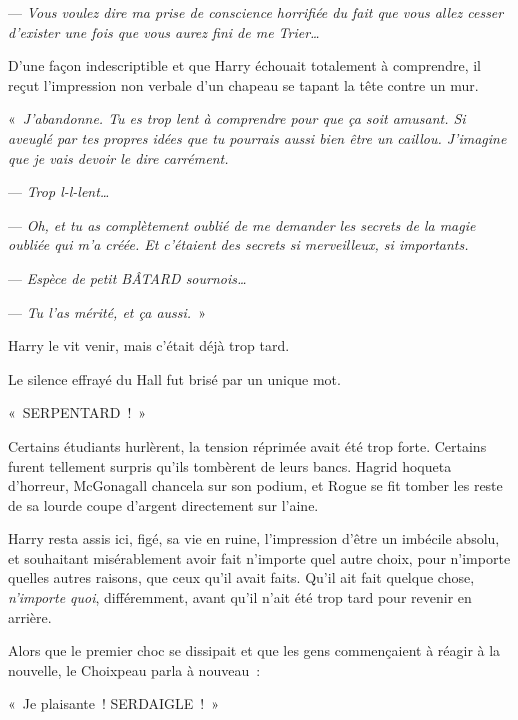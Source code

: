 --- \emph{Vous voulez dire ma prise de conscience horrifiée du fait que vous allez cesser d'exister une fois que vous aurez fini de me Trier…}

D'une façon indescriptible et que Harry échouait totalement à comprendre, il reçut l'impression non verbale d'un chapeau se tapant la tête contre un mur.

«~\emph{J'abandonne. Tu es trop lent à comprendre pour que ça soit amusant. Si aveuglé par tes propres idées que tu pourrais aussi bien être un caillou. J'imagine que je vais devoir le dire carrément.}

--- \emph{Trop l-l-lent…}

--- \emph{Oh, et tu as complètement oublié de me demander les secrets de la magie oubliée qui m'a créée. Et c'étaient des secrets si merveilleux, si importants.}

--- \emph{Espèce de petit BÂTARD sournois…}

--- \emph{Tu l'as mérité, et ça aussi.}~»

Harry le vit venir, mais c'était déjà trop tard.

Le silence effrayé du Hall fut brisé par un unique mot.

«~SERPENTARD~!~»

Certains étudiants hurlèrent, la tension réprimée avait été trop forte. Certains furent tellement surpris qu'ils tombèrent de leurs bancs. Hagrid hoqueta d'horreur, McGonagall chancela sur son podium, et Rogue se fit tomber les reste de sa lourde coupe d'argent directement sur l'aine.

Harry resta assis ici, figé, sa vie en ruine, l'impression d'être un imbécile absolu, et souhaitant misérablement avoir fait n'importe quel autre choix, pour n'importe quelles autres raisons, que ceux qu'il avait faits. Qu'il ait fait quelque chose, \emph{n'importe quoi}, différemment, avant qu'il n'ait été trop tard pour revenir en arrière.

Alors que le premier choc se dissipait et que les gens commençaient à réagir à la nouvelle, le Choixpeau parla à nouveau~:

«~Je plaisante~! SERDAIGLE~!~»
